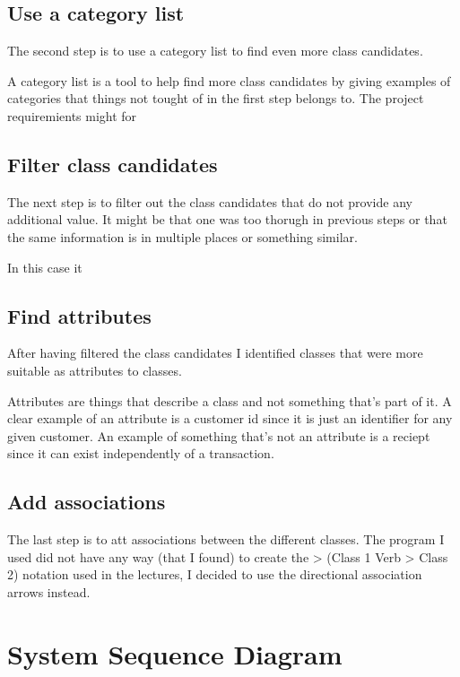 \documentclass[a4paper]{scrreprt}
\begin{document}
        \subsection{Use a category list}
            The second step is to use a category list to find even more class
            candidates.

            A category list is a tool to help find more class candidates by
            giving examples of categories that things not tought of in the first
            step belongs to. The project requiremients might for  
        
        \subsection{Filter class candidates}
            The next step is to filter out the class candidates that do not
            provide any additional value. It might be that one was too thorugh
            in previous steps or that the same information is in multiple places
            or something similar.
            
            In this case it 

        \subsection{Find attributes}
            After having filtered the class candidates I identified classes that
            were more suitable as attributes to classes. 
            
            Attributes are things that describe a class and not something that's
            part of it. A clear example of an attribute is a customer id since
            it is just an identifier for any given customer. An example of
            something that's not an attribute is a reciept since it can exist
            independently of a transaction.

        \subsection{Add associations}
            The last step is to att associations between the different classes.
            The program I used did not have any way (that I found) to create
            the > (Class 1 Verb > Class 2) notation used in the lectures, I
            decided to use the directional association arrows instead. 

    \section{System Sequence Diagram}
            
\end{document}
